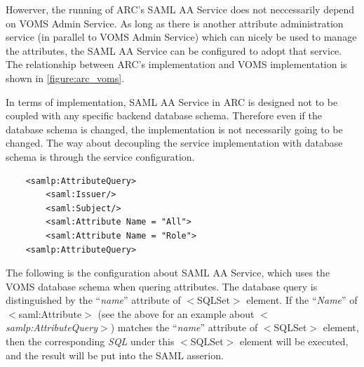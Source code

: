 \documentclass{article}                            %
\begin{document}
Howerver, the running of ARC's SAML AA Service does not neccessarily depend on VOMS Admin Service. As long as there is another attribute administration service (in parallel to VOMS Admin Service) which can nicely be used to manage the attributes, the SAML AA Service can be configured to adopt that service. The relationship between ARC's implementation and VOMS implementation is shown in \ref{figure:arc_voms}.

In terms of implementation, SAML AA Service in ARC is designed not to be coupled with any specific backend database schema. Therefore even if the database schema is changed, the implementation is not necessarily going to be changed. The way about decoupling the service implementation with database schema is through the service configuration.

\begin{verbatim}
    <samlp:AttributeQuery>
        <saml:Issuer/>
        <saml:Subject/>
        <saml:Attribute Name = "All">
        <saml:Attribute Name = "Role">
    <samlp:AttributeQuery>
\end{verbatim}

The following is the configuration about SAML AA Service, which uses the VOMS database schema when quering attributes.
The database query is distinguished by the ``\textit{name}'' attribute of $<$SQLSet$>$ element. If the ``\textit{Name}'' of $<$saml:Attribute$>$ (see the above for an example about \textit{$<$samlp:AttributeQuery$>$}) matches the ``\textit{name}'' attribute of $<$SQLSet$>$ element, then the corresponding \textit{SQL} under this $<$SQLSet$>$ element will be executed, and the result will be put into the SAML asserion.
\end{document}
